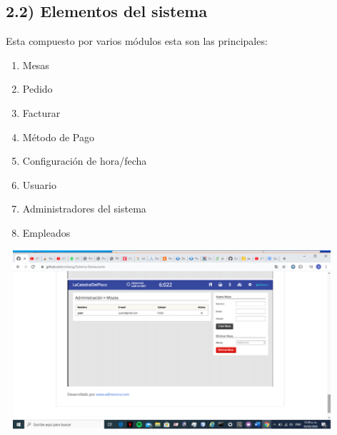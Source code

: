 \documentclass{article} %
\begin{document}
\noindent 

\noindent 

\noindent 

\noindent 

\noindent 

\noindent 

\noindent 

\noindent 

\noindent 

\noindent 

\noindent \textbf{}

\noindent \textbf{}

\noindent \textbf{}

\noindent \textbf{}


\subsection{2.2) Elementos del sistema}

\noindent Esta compuesto por varios m\'{o}dulos esta son las principales:

\begin{enumerate}
\item  Mesas 

\item  Pedido

\item  Facturar

\item  M\'{e}todo de Pago

\item  Configuraci\'{o}n de hora/fecha

\item  Usuario

\item  Administradores del sistema

\item  Empleados 
\end{enumerate}

\noindent 

\noindent 

\noindent \includegraphics*[width=4.86in, height=2.62in, keepaspectratio=false, trim=1.31in 0.94in 1.37in 0.68in]{image5}
\end{document}
